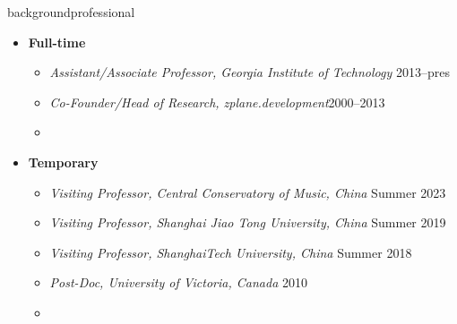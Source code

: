         \begin{frame}{background}{professional}
                   
            \begin{itemize}
                \item \textbf{Full-time}
                    \begin{itemize}
                        \item   \textit{Assistant/Associate Professor, Georgia Institute of Technology}  \hfill{2013--pres}
                        \smallskip
                        \item   \textit{Co-Founder/Head of Research, zplane.development}\hfill 2000--2013
												\smallskip
                        \item[] \phantom{dummy \hfill 2000}
                    \end{itemize}
            \bigskip
                 \item \textbf{Temporary}
                    \begin{itemize}
                        \item   \textit{Visiting Professor, Central Conservatory of Music, China}  \hfill{Summer 2023}
                        \smallskip
                        \item   \textit{Visiting Professor, Shanghai Jiao Tong University, China}  \hfill{Summer 2019}
                        \smallskip
                        \item   \textit{Visiting Professor, ShanghaiTech University, China} \hfill Summer 2018
                        \smallskip
                        \item   \textit{Post-Doc, University of Victoria, Canada} \hfill 2010
												\smallskip
                        \item[] \phantom{dummy \hfill 2000}
                    \end{itemize}
           \end{itemize}
        \end{frame}

        

